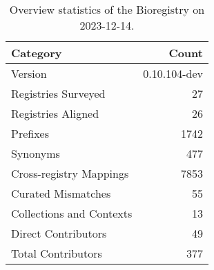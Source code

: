 \begin{table}
\caption{Overview statistics of the Bioregistry on 2023-12-14.}
\label{tab:bioregistry-summary}
\begin{tabular}{lr}
\toprule
Category & Count \\
\midrule
Version & 0.10.104-dev \\
Registries Surveyed & 27 \\
Registries Aligned & 26 \\
Prefixes & 1742 \\
Synonyms & 477 \\
Cross-registry Mappings & 7853 \\
Curated Mismatches & 55 \\
Collections and Contexts & 13 \\
Direct Contributors & 49 \\
Total Contributors & 377 \\
\bottomrule
\end{tabular}
\end{table}
